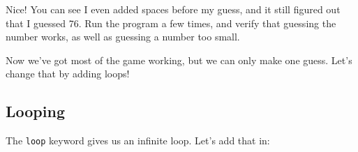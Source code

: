 \documentclass[a4paper,]{book}
\newenvironment{Shaded}{\begin{snugshade}}{\end{snugshade}}
\newcommand{\KeywordTok}[1]{\textcolor[rgb]{0.13,0.29,0.53}{\textbf{{#1}}}}
\newcommand{\NormalTok}[1]{{#1}}
\begin{document}
\begin{Shaded}
\end{Shaded}

Nice! You can see I even added spaces before my guess, and it still
figured out that I guessed 76. Run the program a few times, and verify
that guessing the number works, as well as guessing a number too small.

Now we've got most of the game working, but we can only make one guess.
Let's change that by adding loops!

\subsection{Looping}\label{looping}

The \texttt{loop} keyword gives us an infinite loop. Let's add that in:
\end{document}
